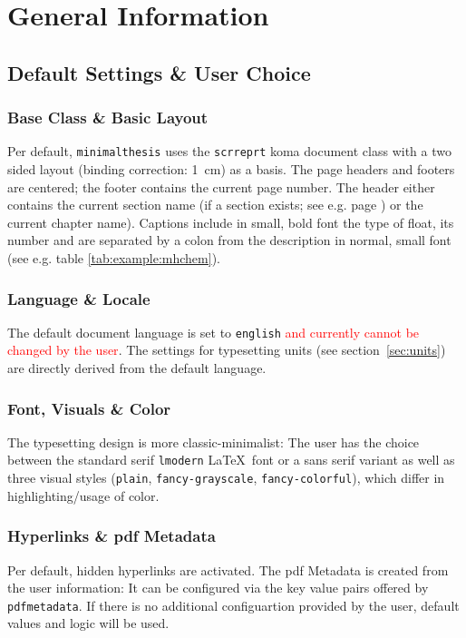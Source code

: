 \chapter{General Information}
	\section{Default Settings \& User Choice}
		\subsection{Base Class \& Basic Layout}
			Per default, \verb|minimalthesis| uses the \verb|scrreprt| koma document class with a two sided layout (binding correction: \SI{1}{\centi\metre}) as a basis. 
			The page headers and footers are centered; the footer contains the current page number. The header either contains the current section name (if a section exists; see e.g. page \pageref{sec:general-functionality-overview}) 
			or the current chapter name).
			\newline Captions include in small, bold font the type of float, its number and are separated by a colon from the description 
			in normal, small font (see e.g. table \ref{tab:example:mhchem}).
		
		\subsection{Language \& Locale}
			The default document language is set to \verb|english| \textcolor{red}{and currently cannot be changed by the user}. 
			The settings for typesetting units (see \mbox{section \ref{sec:units}}) are directly derived from the default language.
		
		\subsection{Font, Visuals \& Color}
			The typesetting design is more classic-minimalist: 
			The user has the choice between the standard serif \verb|lmodern| \LaTeX~font or a sans serif variant as well as 
			three visual styles (\verb|plain|, \verb|fancy-grayscale|, \verb|fancy-colorful|), which differ in highlighting/usage of color.
		
		\subsection{Hyperlinks \& pdf Metadata}
			Per default, hidden hyperlinks are activated. The pdf Metadata is created from the user information: 
			It can be configured via the key value pairs offered by \verb|pdfmetadata|. If there is no additional configuartion provided by the user,
			default values and logic will be used.


